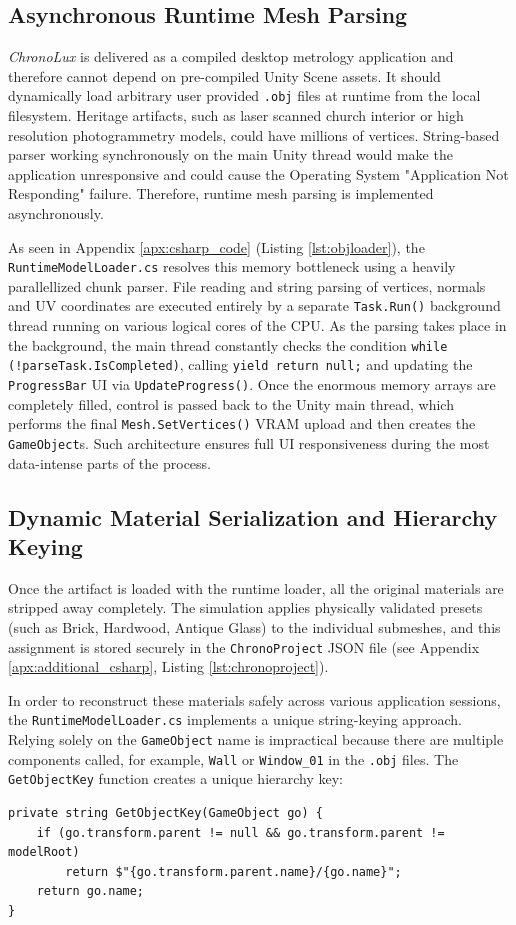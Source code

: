 \subsection{Asynchronous Runtime Mesh Parsing}

\textit{ChronoLux} is delivered as a compiled desktop metrology application and therefore cannot depend on pre-compiled Unity Scene assets. It should dynamically load arbitrary user provided \texttt{.obj} files at runtime from the local filesystem. Heritage artifacts, such as laser scanned church interior or high resolution photogrammetry models, could have millions of vertices. String-based parser working synchronously on the main Unity thread would make the application unresponsive and could cause the Operating System "Application Not Responding" failure. Therefore, runtime mesh parsing is implemented asynchronously.

As seen in Appendix \ref{apx:csharp_code} (Listing \ref{lst:objloader}), the \texttt{RuntimeModelLoader.cs} resolves this memory bottleneck using a heavily parallellized chunk parser. File reading and string parsing of vertices, normals and UV coordinates are executed entirely by a separate \texttt{Task.Run()} background thread running on various logical cores of the CPU. As the parsing takes place in the background, the main thread constantly checks the condition \texttt{while (!parseTask.IsCompleted)}, calling \texttt{yield return null;} and updating the \texttt{ProgressBar} UI via \texttt{UpdateProgress()}. Once the enormous memory arrays are completely filled, control is passed back to the Unity main thread, which performs the final \texttt{Mesh.SetVertices()} VRAM upload and then creates the \texttt{GameObject}s. Such architecture ensures full UI responsiveness during the most data-intense parts of the process.

\subsection{Dynamic Material Serialization and Hierarchy Keying}

Once the artifact is loaded with the runtime loader, all the original materials are stripped away completely. The simulation applies physically validated presets (such as Brick, Hardwood, Antique Glass) to the individual submeshes, and this assignment is stored securely in the \texttt{ChronoProject} JSON file (see Appendix \ref{apx:additional_csharp}, Listing \ref{lst:chronoproject}).

In order to reconstruct these materials safely across various application sessions, the \texttt{RuntimeModelLoader.cs} implements a unique string-keying approach. Relying solely on the \texttt{GameObject} name is impractical because there are multiple components called, for example, \texttt{Wall} or \texttt{Window\_01} in the \texttt{.obj} files. The \texttt{GetObjectKey} function creates a unique hierarchy key:
\begin{lstlisting}[language={[Sharp]C}]
private string GetObjectKey(GameObject go) {
    if (go.transform.parent != null && go.transform.parent != modelRoot)
        return $"{go.transform.parent.name}/{go.name}";
    return go.name;
}
\end{lstlisting}

